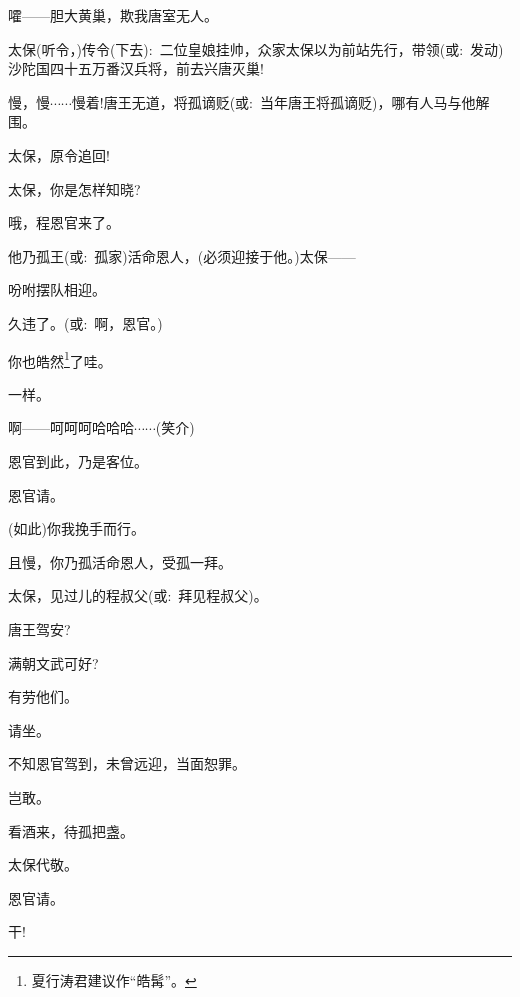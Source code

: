 {嚯------胆大黄巢，欺我唐室无人。

太保(听令，)传令(下去):~二位皇娘挂帅，众家太保以为前站先行，带领({\akai 或}:~发动)沙陀国四十五万番汉兵将，前去兴唐灭巢!

慢，慢$\cdots{}\cdots{}$慢着!唐王无道，将孤谪贬({\akai 或}:~当年唐王将孤谪贬)，哪有人马与他解围。

太保，原令追回!

太保，你是怎样知晓?

哦，程恩官来了。

他乃孤王({\akai 或}:~孤家)活命恩人，(必须迎接于他。)太保------

吩咐摆队相迎。

\vspace{5pt}

久违了。({\akai 或}:~啊，恩官。)

你也皓然\footnote{夏行涛君建议作``皓髯''。}了哇。

一样。\hspace{20pt}~

啊------呵呵呵哈哈哈$\cdots{}\cdots{}$({\hwfs 笑}{\hwfs 介})

恩官到此，乃是客位。

恩官请。\hspace{10pt}~

(如此)你我挽手而行。

\vspace{5pt}

且慢，你乃孤活命恩人，受孤一拜。

太保，见过儿的程叔父({\akai 或}:~拜见程叔父)。

唐王驾安?\hspace{10pt}~

满朝文武可好?

有劳他们。

请坐。\hspace{20pt}~

不知恩官驾到，未曾远迎，当面恕罪。

岂敢。\hspace{20pt}~

看酒来，待孤把盏。

太保代敬。

恩官请。\hspace{10pt}~

干!\hspace{40pt}~

}
